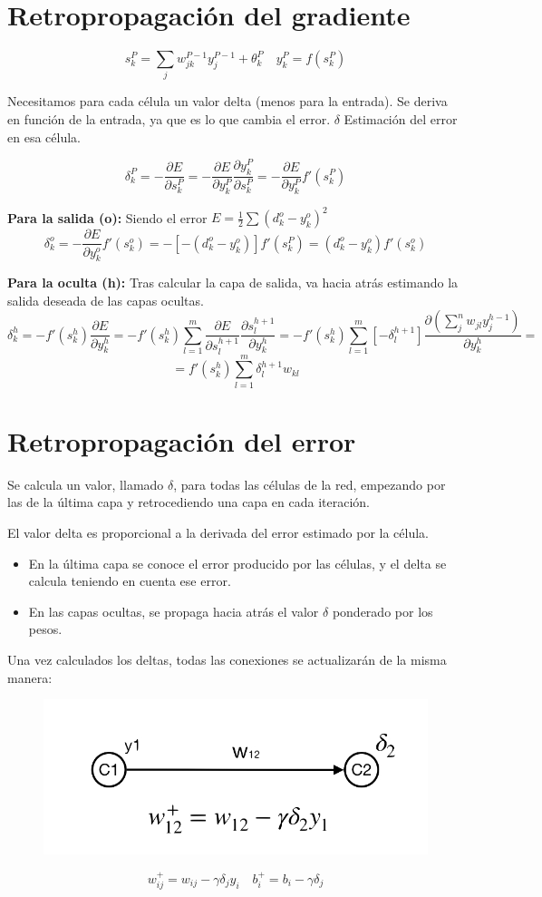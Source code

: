 \documentclass[12pt, twoside, openright]{report} %
\begin{document}
\section{Retropropagación del gradiente}

$$s^P_k= \sum_j w^{P-1}_{jk}y^{P-1}_j+\theta_k^P \quad y^P_k=f(s^P_k)$$

Necesitamos para cada célula un valor delta (menos para la entrada). Se deriva en función de la entrada, ya que es lo que cambia el error. $\delta$ Estimación del error en esa célula.

$$\delta^P_k=-\frac{\partial E}{\partial s^P_k}=-\frac{\partial E}{\partial y^P_k}\frac{\partial y^P_k}{\partial s^P_k}=-\frac{\partial E}{\partial y^P_k}f'(s^P_k)$$

\textbf{Para la salida (o):} Siendo el error $E=\frac 1 2 \sum (d^o_k-y^o_k)^2$
$$\delta^o_k=-\frac{\partial E}{\partial y^o_k}f'(s^o_k)=-[-(d^o_k-y^o_k)]f'(s^P_k)=(d^o_k-y^o_k)f'(s^o_k)$$

\textbf{Para la oculta (h):} Tras calcular la capa de salida, va hacia atrás estimando la salida deseada de las capas ocultas.
$$\delta^h_k=-f'(s^h_k)\frac{\partial E}{\partial y^h_k}=-f'(s^h_k)\sum^{m}_{l=1}\frac{\partial E}{\partial s^{h+1}_l}\frac{\partial s^{h+1}_l}{\partial y^h_k}=-f'(s^h_k)\sum^{m}_{l=1}[-\delta^{h+1}_l]\frac{\partial (\sum_j^n w_{jl}y^{h-1}_j)}{\partial y^h_k}=$$ $$=f'(s^h_k)\sum^{m}_{l=1}\delta^{h+1}_l w_{kl}$$
\pagebreak

\section{Retropropagación del error}
Se calcula un valor, llamado $\delta$, para todas las células de la red, empezando por las de la última capa y retrocediendo una capa en cada iteración.

El valor delta es proporcional a la derivada del error estimado por la célula.
\begin{itemize}
	\item En la última capa se conoce el error producido por las células, y el delta se calcula teniendo en cuenta ese error.
	\item En las capas ocultas, se propaga hacia atrás el valor $\delta$ ponderado por los pesos.
\end{itemize}

Una vez calculados los deltas, todas las conexiones se actualizarán de la misma manera: 
\begin{figure}[H]
	{\includegraphics[scale=.35]{regla-delta.jpg}}
\end{figure}
$$w^+_{ij} = w_{ij}-\gamma \delta_j y_i \quad b^+_{i}=b_i - \gamma \delta_j$$
\end{document}

